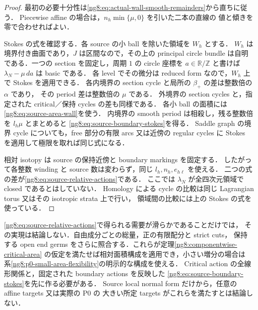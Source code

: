 \begin{proof}
最初の必要十分性は\eqref{ng8:eq:actual-wall-smooth-remainders}から直ちに従う．
Piecewise affine の場合は，$n_h\min\{\mu,0\}$ を引いた二本の直線の
値と傾きを零で合わせればよい．

Stokes の式を確認する．各 source の小 ball を除いた領域を $W_h$ とする．
$W_h$ は境界付き曲面であり，$J$ は区間なので，その上の principal circle
bundle は自明である．一つの section を固定し，周期 $1$ の circle 座標を
$a\in\mathbb R/\mathbb Z$ と書けば $\lambda_N-\mu\,da$ は basic である．
各 level でその微分は reduced form なので，$W_h$ 上で Stokes を適用できる．
各内境界の section cycle と局所の $\beta_+$ の差は整数倍の $\alpha$ であり，
その period 差は整数倍の $\mu$ である．
外境界の section cycles と，指定された critical／保持 cycles の差も同様である．
各小 ball の面積には\eqref{ng8:eq:source-area-wall}を使う．
内境界の smooth period は相殺し，残る整数倍を $l_h\mu$ とまとめると
\eqref{ng8:eq:source-boundary-stokes}を得る．
Saddle graph の境界 cycle についても，free 部分の有限 arcs 又は近傍の
regular cycles に Stokes を適用して極限を取れば同じ式になる．

相対 isotopy は source の保持近傍と boundary markings を固定する．
したがって各整数 winding と source 数は変わらず，同じ $l_h,n_h,e_{h\ell}$ を使える．
二つの式の差が\eqref{ng8:eq:source-relative-actions}である．
ここでは $\lambda_N$ が全四次元領域で closed であるとはしていない．
Homology による cycle の比較は同じ Lagrangian torus 又はその isotropic strata 上で行い，
領域間の比較には上の Stokes の式を使っている．
\end{proof}

\begin{remark}[この条件と有限面積輸送の関係]
\eqref{ng8:eq:source-relative-actions}で得られる需要が滑らかであることだけでは，
その実現は結論しない．自由成分ごとの総量，正の有限配分と strict cuts，
保持する open end germs をさらに照合する．これらが定理\ref{ng8:componentwise-critical-area}
の仮定を満たせば相対面積構成を適用でき，小さい増分の場合は
系\ref{ng8:p0-small-area-flexibility}の明示的な構成を使える．
Critical action の全線形関係と，固定された boundary actions を反映した
\eqref{ng8:eq:source-boundary-stokes}を先に作る必要がある．
Source local normal form だけから，任意の affine targets 又は実際の P0 の
大きい所定 targets がこれらを満たすとは結論しない．
\end{remark}

